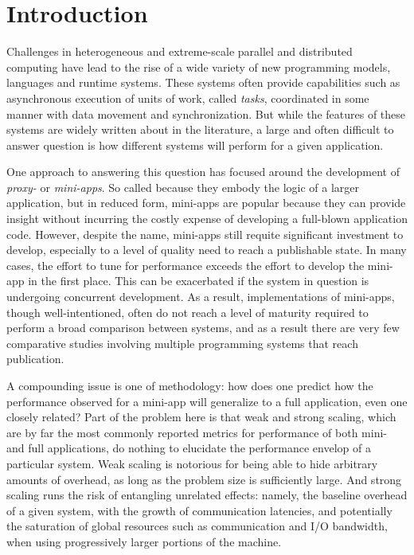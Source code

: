 \section{Introduction}
\label{sec:introduction}

Challenges in heterogeneous and extreme-scale parallel and distributed
computing have lead to the rise of a wide variety of new programming
models, languages and runtime systems. These systems often provide
capabilities such as asynchronous execution of units of work, called
\emph{tasks}, coordinated in some manner with data movement and
synchronization. But while the features of these systems are widely
written about in the literature, a large and often difficult to answer
question is how different systems will perform for a given
application.

One approach to answering this question has focused around the
development of \emph{proxy-} or \emph{mini-apps}. So called because
they embody the logic of a larger application, but in reduced form,
mini-apps are popular because they can provide insight without
incurring the costly expense of developing a full-blown application
code. However, despite the name, mini-apps still requite significant
investment to develop, especially to a level of quality need to reach
a publishable state. In many cases, the effort to tune for performance
exceeds the effort to develop the mini-app in the first place. This
can be exacerbated if the system in question is undergoing concurrent
development. As a result, implementations of mini-apps, though
well-intentioned, often do not reach a level of maturity required to
perform a broad comparison between systems, and as a result there are
very few comparative studies involving multiple programming systems
that reach publication.

A compounding issue is one of methodology: how does one predict how
the performance observed for a mini-app will generalize to a full
application, even one closely related? Part of the problem here is
that weak and strong scaling, which are by far the most commonly
reported metrics for performance of both mini- and full applications,
do nothing to elucidate the performance envelop of a particular
system. Weak scaling is notorious for being able to hide arbitrary
amounts of overhead, as long as the problem size is sufficiently
large. And strong scaling runs the risk of entangling unrelated
effects: namely, the baseline overhead of a given system, with the
growth of communication latencies, and potentially the saturation of
global resources such as communication and I/O bandwidth, when using
progressively larger portions of the machine.

